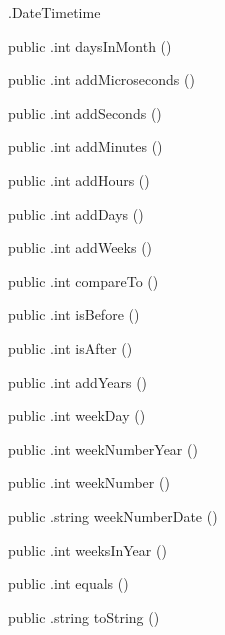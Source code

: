 \begin{CrexxClass}{.DateTime}{time}
\begin{Members}
    \Method
      {public}
      {.int}
      {daysInMonth}
      {()}

    \Method
      {public}
      {.int}
      {addMicroseconds}
      {()}

    \Method
      {public}
      {.int}
      {addSeconds}
      {()}

    \Method
      {public}
      {.int}
      {addMinutes}
      {()}

    \Method
      {public}
      {.int}
      {addHours}
      {()}

    \Method
      {public}
      {.int}
      {addDays}
      {()}

    \Method
      {public}
      {.int}
      {addWeeks}
      {()}

    \Method
      {public}
      {.int}
      {compareTo}
      {()}

    \Method
      {public}
      {.int}
      {isBefore}
      {()}

    \Method
      {public}
      {.int}
      {isAfter}
      {()}

    \Method
      {public}
      {.int}
      {addYears}
      {()}

    \Method
      {public}
      {.int}
      {weekDay}
      {()}

    \Method
      {public}
      {.int}
      {weekNumberYear}
      {()}

    \Method
      {public}
      {.int}
      {weekNumber}
      {()}

    \Method
      {public}
      {.string}
      {weekNumberDate}
      {()}

    \Method
      {public}
      {.int}
      {weeksInYear}
      {()}

    \Method
      {public}
      {.int}
      {equals}
      {()}

    \Method
      {public}
      {.string}
      {toString}
      {()}

  \end{Members}
\end{CrexxClass}

